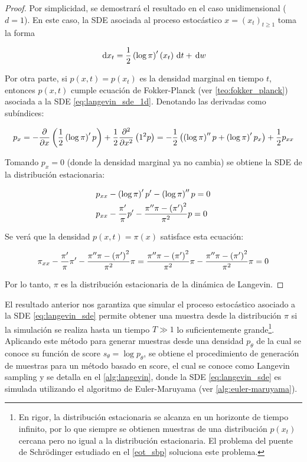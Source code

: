 \begin{proof}
    Por simplicidad, se demostrará el resultado en el caso unidimensional ($d=1$). En este caso, la SDE asociada al proceso estocástico $x=(x_t)_{t\geq 1}$ toma la forma

    \begin{equation}
        \label{eq:langevin_sde_1d}
        \,\operatorname{d}\! x_t = \frac{1}{2}\left(\log \pi\right)'(x_t) \,\operatorname{d}\! t + \,\operatorname{d}\! w
    \end{equation}
    
    Por otra parte, si $p(x,t)=p(x_t)$ es la densidad marginal en tiempo $t$, entonces $p(x,t)$ cumple ecuación de Fokker-Planck (ver \autoref{teo:fokker_planck}) asociada a la SDE \eqref{eq:langevin_sde_1d}. Denotando las derivadas como subíndices:

    \begin{align*}
        p_x
        = -\frac{\partial}{\partial x} \left(\frac{1}{2}\left(\log \pi\right)' p\right) + \frac{1}{2} \frac{\partial^2}{\partial x^2} \left(1^2 p\right)
        = -\frac{1}{2}\left(\left(\log\pi\right)''p+\left(\log\pi\right)'p_x\right) + \frac{1}{2}p_{xx}
    \end{align*}

    Tomando $p_x=0$ (donde la densidad marginal ya no cambia) se obtiene la SDE de la distribución estacionaria:

    \begin{align*}
        &p_{xx} - \left(\log\pi\right)'p' - \left(\log\pi\right)'' p = 0\\
        &p_{xx}-\frac{\pi'}{\pi}p' - \frac{\pi''\pi-\left(\pi'\right)^2}{\pi^2}p = 0
    \end{align*}

    Se verá que la densidad $p(x,t)=\pi(x)$ satisface esta ecuación:

    \begin{equation*}
        \pi_{xx}-\frac{\pi'}{\pi}\pi' - \frac{\pi''\pi-\left(\pi'\right)^2}{\pi^2}\pi
        = \frac{\pi''\pi-\left(\pi'\right)^2}{\pi^2}\pi - \frac{\pi''\pi-\left(\pi'\right)^2}{\pi^2}\pi = 0
    \end{equation*}

    Por lo tanto, $\pi$ es la distribución estacionaria de la dinámica de Langevin.
\end{proof}

El resultado anterior nos garantiza que simular el proceso estocástico asociado a la SDE \eqref{eq:langevin_sde} permite obtener una muestra desde la distribución $\pi$ si la simulación se realiza hasta un tiempo $T\gg 1$ lo suficientemente grande\footnote{En rigor, la distribución estacionaria se alcanza en un horizonte de tiempo infinito, por lo que siempre se obtienen muestras de una distribución $p(x_t)$ cercana pero no igual a la distribución estacionaria. El problema del puente de Schrödinger estudiado en el \autoref{eot_sbp} soluciona este problema.}. Aplicando este método para generar muestras desde una densidad $p_\theta$ de la cual se conoce su función de score $s_\theta=\log p_\theta$, se obtiene el procedimiento de generación de muestras para un método basado en score, el cual se conoce como Langevin sampling y se detalla en el \autoref{alg:langevin}, donde la SDE \eqref{eq:langevin_sde} es simulada utilizando el algoritmo de Euler-Maruyama (ver \autoref{alg:euler-maruyama}).

